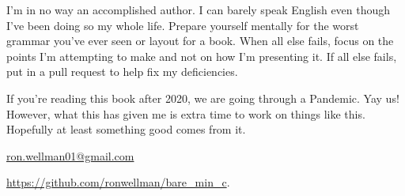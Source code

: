 \documentclass[../main.tex]{subfiles}
\begin{document}
I'm in no way an accomplished author.  I can barely speak English even though I've been doing so my whole life.  Prepare yourself mentally for the worst grammar you've ever seen or layout for a book.  When all else fails, focus on the points I'm attempting to make and not on how I'm presenting it.  If all else fails, put in a pull request to help fix my deficiencies.

If you're reading this book after 2020, we are going through a Pandemic.  Yay us!  However, what this has given me is extra time to work on things like this.  Hopefully at least something good comes from it.

\href{mailto:ron.wellman01@gmail.com}{ron.wellman01@gmail.com}

\href{https://github.com/ronwellman/bare_min_c}{https://github.com/ronwellman/bare\_min\_c}.

\mainmatter
\end{document}

